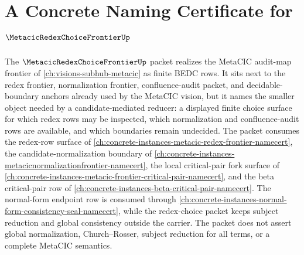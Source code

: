 \chapter{A Concrete Naming Certificate for $\MetacicRedexChoiceFrontierUp$}
\label{ch:concrete-instances-metacic-redex-choice-frontier-namecert}

The $\MetacicRedexChoiceFrontierUp$ packet realizes the MetaCIC audit-map frontier of \autoref{ch:visions-subhub-metacic} as finite BEDC rows. It sits next to the redex frontier, normalization frontier, confluence-audit packet, and decidable-boundary anchors already used by the MetaCIC vision, but it names the smaller object needed by a candidate-mediated reducer: a displayed finite choice surface for which redex rows may be inspected, which normalization and confluence-audit rows are available, and which boundaries remain undecided. The packet consumes the redex-row surface of \autoref{ch:concrete-instances-metacic-redex-frontier-namecert}, the candidate-normalization boundary of \autoref{ch:concrete-instances-metacicnormalizationfrontier-namecert}, the local critical-pair fork surface of \autoref{ch:concrete-instances-metacic-frontier-critical-pair-namecert}, and the beta critical-pair row of \autoref{ch:concrete-instances-beta-critical-pair-namecert}. The normal-form endpoint row is consumed through \autoref{ch:concrete-instances-normal-form-consistency-seal-namecert}, while the redex-choice packet keeps subject reduction and global consistency outside the carrier. The packet does not assert global normalization, Church--Rosser, subject reduction for all terms, or a complete MetaCIC semantics.

